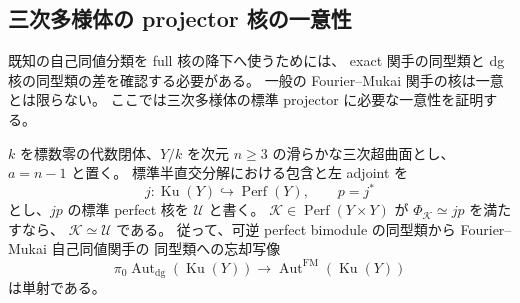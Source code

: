 \subsection{三次多様体の projector 核の一意性}

既知の自己同値分類を full 核の降下へ使うためには、
exact 関手の同型類と dg 核の同型類の差を確認する必要がある。
一般の Fourier--Mukai 関手の核は一意とは限らない。
ここでは三次多様体の標準 projector に必要な一意性を証明する。

\begin{lemma}
\label{lem:nfm-projector-kernel-uniqueness}
$k$ を標数零の代数閉体、$Y/k$ を次元 $n\ge3$ の滑らかな三次超曲面とし、
$a=n-1$ と置く。
標準半直交分解における包含と左 adjoint を
\[
 j:\operatorname{Ku}(Y)\hookrightarrow\operatorname{Perf}(Y),
 \qquad p=j^*
\]
とし、$jp$ の標準 perfect 核を $\mathcal U$ と書く。
$\mathcal K\in\operatorname{Perf}(Y\times Y)$ が
$\Phi_{\mathcal K}\simeq jp$ を満たすなら、
$\mathcal K\simeq\mathcal U$ である。
従って、可逆 perfect bimodule の同型類から Fourier--Mukai 自己同値関手の
同型類への忘却写像
\[
 \pi_0\operatorname{Aut}_{\mathrm{dg}}(\operatorname{Ku}(Y))
 \longrightarrow\operatorname{Aut}^{\mathrm{FM}}(\operatorname{Ku}(Y))
\]
は単射である。
\end{lemma}


